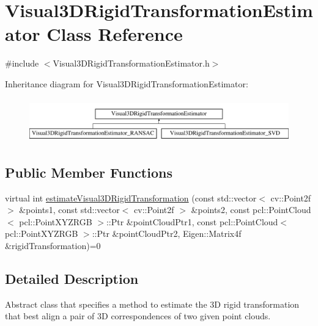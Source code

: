 \hypertarget{class_visual3_d_rigid_transformation_estimator}{
\section{Visual3DRigidTransformationEstimator Class Reference}
\label{class_visual3_d_rigid_transformation_estimator}
}


{\ttfamily \#include $<$Visual3DRigidTransformationEstimator.h$>$}

Inheritance diagram for Visual3DRigidTransformationEstimator:\begin{figure}[H]
\begin{center}
\leavevmode
\includegraphics[height=1.911263cm]{class_visual3_d_rigid_transformation_estimator}
\end{center}
\end{figure}
\subsection*{Public Member Functions}
\begin{DoxyCompactItemize}
\item 
virtual int \hyperlink{class_visual3_d_rigid_transformation_estimator_a2f431dce774df16f4950840ec1d1f37c}{estimateVisual3DRigidTransformation} (const std::vector$<$ cv::Point2f $>$ \&points1, const std::vector$<$ cv::Point2f $>$ \&points2, const pcl::PointCloud$<$ pcl::PointXYZRGB $>$::Ptr \&pointCloudPtr1, const pcl::PointCloud$<$ pcl::PointXYZRGB $>$::Ptr \&pointCloudPtr2, Eigen::Matrix4f \&rigidTransformation)=0
\end{DoxyCompactItemize}


\subsection{Detailed Description}
Abstract class that specifies a method to estimate the 3D rigid transformation that best align a pair of 3D correspondences of two given point clouds. 

